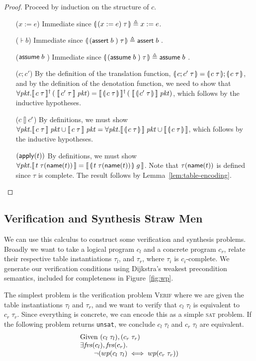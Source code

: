 \begin{proof}

  Proceed by induction on the structure of $c$.
  \begin{enumerate}[align=left]
  \item[($x:=e$)] Immediate since $\llparenthesis\, (x:=e)\; \tau\, \rrparenthesis \triangleq x := e$.
  \item[($\assert b$)] Immediate since $\llparenthesis\, (\mathsf{assert}\; b\;)\; \tau\, \rrparenthesis \triangleq \mathsf{assert}\; b\;$.
  \item[($\mathsf{assume}\; b\;$)] Immediate since $\llparenthesis\, (\mathsf{assume}\; b\;)\; \tau\, \rrparenthesis \triangleq \mathsf{assume}\; b\;$.
  \item[($c;c'$)] By the definition of the translation function,
    $\llparenthesis\, c;c'\; \tau\, \rrparenthesis = \llparenthesis\, c\; \tau\, \rrparenthesis;\llparenthesis\, c\;\tau\, \rrparenthesis$,
    and by the definition of the denotation function, we need to show
    that
    $\forall \mathit{pkt}. \llbracket\,c\; \tau\,\rrbracket^\dag\left(\;\llbracket\,c'\;
        \tau\,\rrbracket\;\mathit{pkt}\right) = \llbracket\,\llparenthesis\, c\;
        \tau\, \rrparenthesis\,\rrbracket^\dag\left(\;\llbracket\,\llparenthesis\, c'\; \tau\, \rrparenthesis\,\rrbracket\;\mathit{pkt}\right)$,
    which follows by the inductive hypotheses.
  \item[($c \talloblong c'$)] By definitions, we must show
    $\forall \mathit{pkt}. \llbracket\,c\; \tau\,\rrbracket\; \mathit{pkt} \cup \llbracket\,c\; \tau\,\rrbracket\;
    \mathit{pkt} = \forall \mathit{pkt}. \llbracket\,\llparenthesis\, c\; \tau\, \rrparenthesis\,\rrbracket\; \mathit{pkt} \cup
    \llbracket\,\llparenthesis\, c\; \tau\, \rrparenthesis\,\rrbracket$, which follows by the inductive
    hypotheses.
  \item[$(\mathsf{apply}(t))$] By definitions, we must show
    $\forall \mathit{pkt}. \llbracket\,t\; \tau(\mathsf{name}(t))\,\rrbracket = \llbracket\,\llparenthesis\, t\;
        \tau(\mathsf{name}(t))\, \rrparenthesis\; g\,\rrbracket$. Note that $\tau(\mathsf{name}(t))$ is defined since $\tau$ is
    complete. The result follows by Lemma~\ref{lem:table-encoding}.
  \end{enumerate}
\end{proof}


\subsection{Verification and Synthesis Straw Men}

We can use this calculus to construct some verification and synthesis
problems. Broadly we want to take a logical program $c_l$ and a concrete program
$c_r$, relate their respective table instantiations $\tau_l$, and $\tau_r$,
where $\tau_i$ is $c_i$-complete.  We generate our verification conditions using
Dijkstra's weakest precondition semantics, included for completeness in
Figure~\ref{fig:wp}.

The simplest problem is the verification problem \textsc{Verif} where we are
given the table instantiations $\tau_l$ and $\tau_r$, and we want to verify that
$c_l\; \tau_l$ is equivalent to $c_r\; \tau_r$. Since everything is concrete, we
can encode this as a simple \textsc{sat} problem. If the following problem
returns \texttt{unsat}, we conclude $c_l\; \tau_l$ and $c_r\; \tau_l$ are
equivalent.
\[\begin{array}{lcl}
    \text{Given }( c_l\; \tau_l), (c_r\; \tau_r) \\
    \exists \mathit{fvs}(c_l), \mathit{fvs}(c_r). \\
    \qquad \neg(wp(c_l\; \tau_l) \iff wp(c_r\; \tau_r))
  \end{array}
\]

